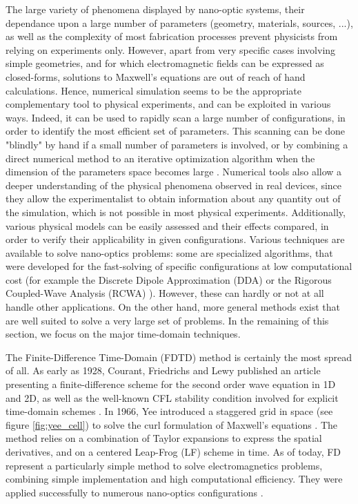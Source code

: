 The large variety of phenomena displayed by nano-optic systems, their dependance upon a large number of parameters (geometry, materials, sources, ...), as well as the complexity of most fabrication processes prevent physicists from relying on experiments only. However, apart from very specific cases involving simple geometries, and for which electromagnetic fields can be expressed as closed-forms, solutions to Maxwell's equations are out of reach of hand calculations. Hence, numerical simulation seems to be the appropriate complementary tool to physical experiments, and can be exploited in various ways. Indeed, it can be used to rapidly scan a large number of configurations, in order to identify the most efficient set of parameters. This scanning can be done "blindly" by hand if a small number of parameters is involved, or by combining a direct numerical method to an iterative optimization algorithm when the dimension of the parameters space becomes large \cite{Pavaskar1}. Numerical tools also allow a deeper understanding of the physical phenomena observed in real devices, since they allow the experimentalist to obtain information about any quantity out of the simulation, which is not possible in most physical experiments. Additionally, various physical models can be easily assessed and their effects compared, in order to verify their applicability in given configurations. Various techniques are available to solve nano-optics problems: some are specialized algorithms, that were developed for the fast-solving of specific configurations at low computational cost (for example the Discrete Dipole Approximation (DDA) \cite{Draine1} or the Rigorous Coupled-Wave Analysis (RCWA) \cite{Moharam1}). However, these can hardly or not at all handle other applications. On the other hand, more general methods exist that are well suited to solve a very large set of problems. In the remaining of this section, we focus on the major time-domain techniques.

The Finite-Difference Time-Domain (FDTD) method is certainly the most spread of all. As early as 1928, Courant, Friedrichs and Lewy published an article presenting a finite-difference scheme for the second order wave equation in 1D and 2D, as well as the well-known CFL stability condition involved for explicit time-domain schemes \cite{Courant1}. In 1966, Yee introduced a staggered grid in space (see figure \ref{fig:yee_cell}) to solve the curl formulation of Maxwell's equations \cite{Yee1}. The method relies on a combination of Taylor expansions to express the spatial derivatives, and on a centered Leap-Frog (LF) scheme in time. As of today, FD represent a particularly simple method to solve electromagnetics problems, combining simple implementation and high computational efficiency. They were applied successfully to numerous nano-optics configurations \cite{Salski1}.

